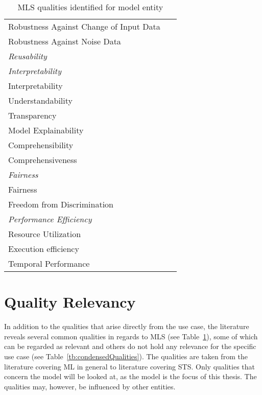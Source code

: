\begin{table}[h]
\begin{tabular}{p{} p{}}
        Robustness Against Change of Input Data &~\cite{nakamichi_requirements-driven_2020} \\
        Robustness Against Noise Data &~\cite{nakamichi_requirements-driven_2020} \\
        \midrule
        \textit{Reusability} &~\cite{ashmore_assuring_2021} \\
        \midrule
        \textit{Interpretability} \\
        Interpretability &~\cite{ashmore_assuring_2021, siebert_construction_2021, zhang_machine_2020}\\
        Understandability &~\cite{nakamichi_requirements-driven_2020} \\
        Transparency &~\cite{arpteg_software_2018} \\
        Model Explainability &~\cite{vogelsang_requirements_2019} \\
        Comprehensibility &~\cite{ashmore_assuring_2021} \\
        Comprehensiveness &~\cite{ashmore_assuring_2021} \\
        \midrule
        \textit{Fairness}\\
        Fairness &~\cite{siebert_construction_2021, zhang_machine_2020} \\
        Freedom from Discrimination &~\cite{vogelsang_requirements_2019} \\
        \midrule
        \textit{Performance Efficiency} \\
        Resource Utilization &~\cite{siebert_construction_2021,
                                nakamichi_requirements-driven_2020} \\
        Execution efficiency &~\cite{siebert_construction_2021} \\
        Temporal Performance &~\cite{nakamichi_requirements-driven_2020} \\
        \bottomrule
    \end{tabular}
    \caption{MLS qualities identified for model entity\label{tb:LiteratureQualitiesModel}}
\end{table}
\FloatBarrier%

\section{Quality Relevancy}\label{se:relevant-qualities}
In addition to the qualities that arise directly from the use case, the literature reveals several
common qualities in regards to \ac{MLS} (see Table~\ref{tb:LiteratureQualitiesModel}), some of which
can be regarded as relevant and others do not hold any relevance for the specific use case (see
Table~\ref{tb:condensedQualities}).
The qualities are taken from the literature covering \ac{ML} in general to literature
covering \ac{STS}.
Only qualities that concern the model will be looked at, as the model is the focus of this thesis.
The qualities may, however, be influenced by other entities.

